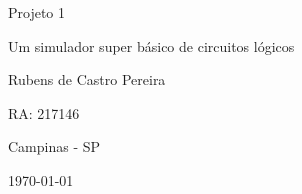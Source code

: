\begin{titlepage}
\begin{center}
\vfill


{\fontsize{28}{\baselineskip}\selectfont
Projeto 1
}

\vfill




{\fontsize{36}{\baselineskip}\selectfont
Um simulador super básico de circuitos lógicos
}

\vfill



{\fontsize{20}{\baselineskip}\selectfont
Rubens de Castro Pereira

RA: 217146
}


	
    
    
    
	
	
	

\vfill





{\fontsize{14}{\baselineskip}\selectfont
	Campinas - SP

	\today
}

\end{center}
\end{titlepage}